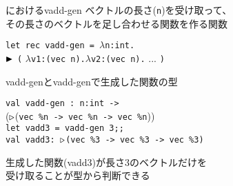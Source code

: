 \documentclass[dvipdfmx,aspectratio=169, 20pt]{beamer}
\begin{document}
\begin{frame}[fragile]{\LMD におけるvadd-gen}
    ベクトルの長さ(\verb|n|)を受け取って、\\その長さのベクトルを足し合わせる関数を作る関数
    \begin{exampleblock}{}
        \hspace{5mm} \verb|let rec vadd-gen = |$\lambda$\verb|n:int.| \\
        \hspace{10mm} ${\mathop{\blacktriangleright}}$ \verb|(| $\lambda$\verb|v1:(vec |\onslide<2->{\%}\verb|n).|$\lambda$\verb|v2:(vec |\verb|n).| ... \verb|)|
    \end{exampleblock}
\end{frame}

\begin{frame}[fragile]{vadd-genとvadd-genで生成した関数の型}
    \newcommand{\Vn}{\text{vec}\ \%n}
    \newcommand{\Vt}{\text{vec}\ \%3}
    \begin{exampleblock}{}
        \hspace{5mm} \verb|val vadd-gen : n:int -> | \\
        \hspace{20mm} (${\mathop{\triangleright}}$(\verb|vec %n -> vec %n -> vec %n|)) \\[2mm]
        \hspace{5mm} \verb|let vadd3 = vadd-gen 3;;| \\
        \hspace{5mm} \verb|val vadd3: |${\mathop{\triangleright}}$\verb|(vec %3 -> vec %3 -> vec %3)|
    \end{exampleblock}
    生成した関数(vadd3)が長さ3のベクトルだけを\\受け取ることが型から判断できる
\end{frame}
\end{document}
